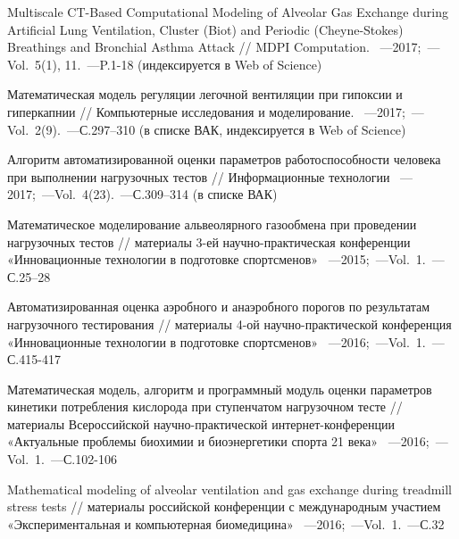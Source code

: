 \clearpage
{}
{}	%

\begin{thebibliography}{}
    
     Multiscale CT-Based Computational Modeling of Alveolar Gas Exchange during Artificial Lung Ventilation, Cluster (Biot) and Periodic (Cheyne-Stokes) Breathings and Bronchial Asthma Attack // MDPI Computation. ~---2017;~---Vol.~5(1), 11.~---P.1-18 (индексируется в Web of Science)
    
     Математическая модель регуляции легочной вентиляции при гипоксии и гиперкапнии // Компьютерные исследования и моделирование. ~---2017;~---Vol.~2(9).~---С.297–310 (в списке ВАК, индексируется в Web of Science)
    
     Алгоритм автоматизированной оценки параметров работоспособности человека при выполнении нагрузочных тестов // Информационные технологии ~---2017;~---Vol.~4(23).~---С.309–314 (в списке ВАК)

     Математическое моделирование альвеолярного газообмена при проведении нагрузочных тестов // материалы 3-ей научно-практическая конференции «Инновационные технологии в подготовке спортсменов» ~---2015;~---Vol.~1.~---С.25–28
    
     Автоматизированная оценка аэробного и анаэробного порогов по результатам нагрузочного тестирования // материалы 4-ой научно-практической конференция «Инновационные технологии в подготовке спортсменов» ~---2016;~---Vol.~1.~---С.415-417
    
     Математическая модель, алгоритм и программный модуль оценки параметров кинетики потребления кислорода при ступенчатом нагрузочном тесте // материалы Всероссийской научно-практической интернет-конференции «Актуальные проблемы биохимии и биоэнергетики спорта 21 века» ~---2016;~---Vol.~1.~---С.102-106

     Mathematical modeling of alveolar ventilation and gas exchange during treadmill stress tests // материалы российской конференции с международным участием «Экспериментальная и компьютерная биомедицина» ~---2016;~---Vol.~1.~---С.32
    

\end{thebibliography}

